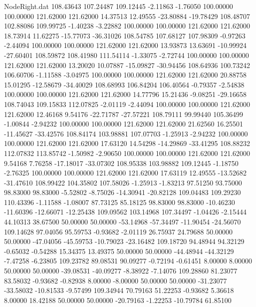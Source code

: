 \begin{filecontents}{NodeRight.dat}
 108.43643  107.24487  109.12445    -2.11863   -1.76050  100.00000  100.00000  121.62000  121.62000   14.37513   12.49555  -23.80884  -19.78429
 108.48707  102.88086  109.99725    -1.40238   -3.22882  100.00000  100.00000  121.62000  121.62000   18.73914   11.62275  -15.77073  -36.31026
 108.54785  107.68127  107.98309    -0.97263   -2.44094  100.00000  100.00000  121.62000  121.62000   13.93873   13.63691  -10.99924  -27.60401
 108.59872  108.41980  111.54114    -1.33075   -2.72744  100.00000  100.00000  121.62000  121.62000   13.20020   10.07887  -15.09827  -30.94456
 108.64936  100.73242  106.60706    -1.11588   -3.04975  100.00000  100.00000  121.62000  121.62000   20.88758   15.01295  -12.58679  -34.40029
 108.68993  106.84204  106.40564    -0.79357   -2.54838  100.00000  100.00000  121.62000  121.62000   14.77796   15.21436   -9.08251  -29.16658
 108.74043  109.15833  112.07825    -2.01119   -2.44094  100.00000  100.00000  121.62000  121.62000   12.46168    9.54176  -22.71787  -27.57221
 108.79111   99.99440  105.36499    -1.00844   -2.94232  100.00000  100.00000  121.62000  121.62000   21.62560   16.25501  -11.45627  -33.42576
 108.84174  103.98881  107.07703    -1.25913   -2.94232  100.00000  100.00000  121.62000  121.62000   17.63120   14.54298  -14.29869  -33.41295
 108.88232  112.07832  113.85742    -1.50982   -2.90650  100.00000  100.00000  121.62000  121.62000    9.54168    7.76258  -17.18017  -33.07302
 108.95338  103.98882  109.12445    -1.18750   -2.76325  100.00000  100.00000  121.62000  121.62000   17.63119   12.49555  -13.52682  -31.47610
 108.99422  104.35802  107.58026    -1.25913   -1.83213   97.51250   93.75000   98.83000   98.83000   -5.52802   -8.75026  -14.30941  -20.82128
 109.04483  109.29230  110.43396    -1.11588   -1.08007   87.73125   85.18125   98.83000   98.83000  -10.46230  -11.60396  -12.66071  -12.25438
 109.09562  103.14968  107.34497    -1.04426   -2.15444   44.10313   38.67500   50.00000   50.00000  -53.14968  -57.34497  -11.90454  -24.56070
 109.14628   97.04056   95.59753    -0.93682   -2.01119   26.75937   24.79688   50.00000   50.00000  -47.04056  -45.59753  -10.79023  -23.16482
 109.18720   94.48944   94.32129    -0.65032   -0.54288   15.34375   13.49375   50.00000   50.00000  -44.48944  -44.32129   -7.47258   -6.23805
 109.23782   89.08531   90.09277    -0.72194   -0.61451    8.00000    8.00000   50.00000   50.00000  -39.08531  -40.09277   -8.38922   -7.14076
 109.28860   81.23077   83.58032    -0.93682   -0.82938    8.00000   -8.00000   50.00000   50.00000  -31.23077  -33.58032  -10.81533   -9.57499
 109.34944   70.79163   51.22253    -0.93682    5.36618    8.00000   18.42188   50.00000   50.00000  -20.79163   -1.22253  -10.79784   61.85100

\end{filecontents}
